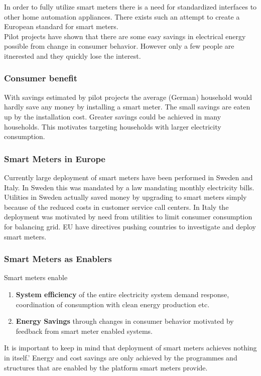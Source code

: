 In order to fully utilize smart meters there is a need for standardized interfaces to other home automation appliances.
There exists such an attempt to create a European standard for smart meters.\\

Pilot projects have shown that there are some easy savings in electrical energy possible from change in consumer behavior.
However only a few people are itnerested and they quickly lose the interest.

\subsubsection{Consumer benefit}
With savings estimated by pilot projects the average (German) household would hardly save any money by installing a smart meter. The small savings are eaten up by the installation cost.
Greater savings could be achieved in many households.
This motivates targeting households with larger electricity consumption.

\subsubsection{Smart Meters in Europe}
Currently large deployment of smart meters have been performed in Sweden and Italy.
In Sweden this was mandated by a law mandating monthly electricity bills.
Utilities in Sweden actually saved money by upgrading to smart meters simply because of the reduced costs in customer service call centers.
In Italy the deployment was motivated by need from utilities to limit consumer consumption for balancing grid.
EU have directives pushing countries to investigate and deploy smart meters.

\subsubsection{Smart Meters as Enablers}
Smart meters enable
\begin{enumerate}
    \item \textbf{System efficiency} of the entire electricity system demand response, coordination of consumption with clean energy production etc.
    \item \textbf{Energy Savings} through changes in consumer behavior motivated by feedback from smart meter enabled systems.
\end{enumerate}

It is important to keep in mind that deployment of smart meters achieves nothing in itself.'
Energy and cost savings are only achieved by the programmes and structures that are enabled by the platform smart meters provide.


